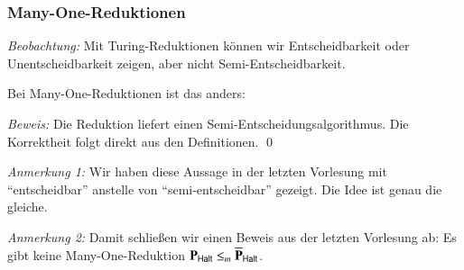 \documentclass[onlymath]{beamer}
\begin{document}
\begin{frame}\frametitle{Many-One-Reduktionen}

\emph{Beobachtung:} Mit Turing-Reduktionen können wir Entscheidbarkeit oder Unentscheidbarkeit zeigen, aber nicht Semi-Entscheidbarkeit.\medskip

Bei Many-One-Reduktionen ist das anders:


\pause\emph{Beweis:} Die Reduktion liefert einen Semi-Entscheidungs\-algorithmus.
Die Korrektheit folgt direkt aus den Definitionen.
\qed\bigskip

\emph{Anmerkung 1:} Wir haben diese Aussage in der letzten Vorlesung mit "`entscheidbar"' anstelle
von "`semi-entscheidbar"' gezeigt. Die Idee ist genau die gleiche.

\emph{Anmerkung 2:} Damit schließen wir einen Beweis aus der letzten Vorlesung ab: Es gibt keine Many-One-Reduktion $\textbf{\textcolor{black}{P}}_{\textsf{Halt}}\leq_m \overline{\textbf{\textcolor{black}{P}}}_{\textsf{Halt}}$.

\end{frame}

% 
% 


\end{document}
